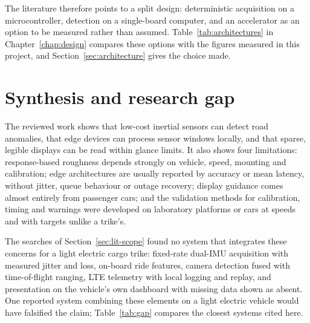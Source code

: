 The literature therefore points to a split design: deterministic acquisition on a microcontroller, detection on a single-board computer, and an accelerator as an option to be measured rather than assumed. Table~\ref{tab:architectures} in Chapter~\ref{chap:design} compares these options with the figures measured in this project, and Section~\ref{sec:architecture} gives the choice made.

\section{Synthesis and research gap}
\label{sec:lit-synthesis}

The reviewed work shows that low-cost inertial sensors can detect road anomalies, that edge devices can process sensor windows locally, and that sparse, legible displays can be read within glance limits. It also shows four limitations: response-based roughness depends strongly on vehicle, speed, mounting and calibration; edge architectures are usually reported by accuracy or mean latency, without jitter, queue behaviour or outage recovery; display guidance comes almost entirely from passenger cars; and the validation methods for calibration, timing and warnings were developed on laboratory platforms or cars at speeds and with targets unlike a trike's.

The searches of Section~\ref{sec:lit-scope} found no system that integrates these concerns for a light electric cargo trike: fixed-rate dual-IMU acquisition with measured jitter and loss, on-board ride features, camera detection fused with time-of-flight ranging, LTE telemetry with local logging and replay, and presentation on the vehicle's own dashboard with missing data shown as absent. One reported system combining these elements on a light electric vehicle would have falsified the claim; Table~\ref{tab:gap} compares the closest systems cited here.

